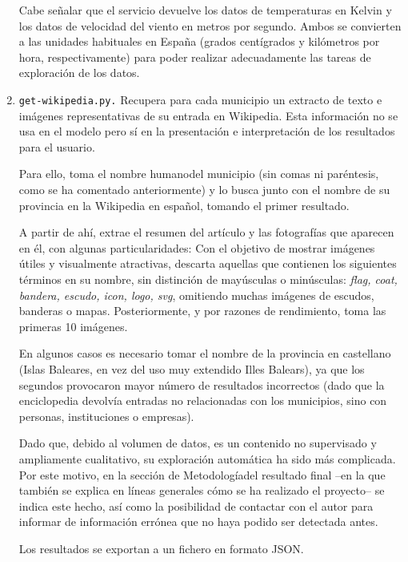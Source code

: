 \begin{enumerate}
    Cabe señalar que el servicio devuelve los datos de temperaturas en Kelvin y los datos de velocidad del viento en metros por segundo. Ambos se convierten a las unidades habituales en España (grados centígrados y kilómetros por hora, respectivamente) para poder realizar adecuadamente las tareas de exploración de los datos.
    
    \item \texttt{get-wikipedia.py.} Recupera para cada municipio un extracto de texto e imágenes representativas de su entrada en Wikipedia. Esta información no se usa en el modelo pero sí en la presentación e interpretación de los resultados para el usuario.

    Para ello, toma el nombre \guillemotleft humano\guillemotright\space del municipio (sin comas ni paréntesis, como se ha comentado anteriormente) y lo busca junto con el nombre de su provincia en la Wikipedia en español, tomando el primer resultado.
    
    A partir de ahí, extrae el resumen del artículo y las fotografías que aparecen en él, con algunas particularidades: Con el objetivo de mostrar imágenes útiles y visualmente atractivas, descarta aquellas que contienen los siguientes términos en su nombre, sin distinción de mayúsculas o minúsculas: \textit{flag, coat, bandera, escudo, icon, logo, svg}, omitiendo muchas imágenes de escudos, banderas o mapas. Posteriormente, y por razones de rendimiento, toma las primeras 10 imágenes.
    
    En algunos casos es necesario tomar el nombre de la provincia en castellano (\guillemotleft Islas Baleares\guillemotright, en vez del uso muy extendido \guillemotleft Illes Balears\guillemotright), ya que los segundos provocaron mayor número de resultados incorrectos (dado que la enciclopedia devolvía entradas no relacionadas con los municipios, sino con personas, instituciones o empresas).
    
    Dado que, debido al volumen de datos, es un contenido no supervisado y ampliamente cualitativo, su exploración automática ha sido más complicada. Por este motivo, en la sección de \guillemotleft Metodología\guillemotright\space del resultado final –en la que también se explica en líneas generales cómo se ha realizado el proyecto– se indica este hecho, así como la posibilidad de contactar con el autor para informar de información errónea que no haya podido ser detectada antes.
    
    Los resultados se exportan a un fichero en formato JSON.


\end{enumerate}
